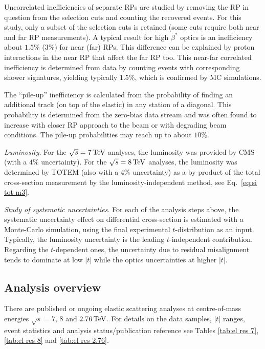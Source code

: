 \documentclass{desyproc}
\def\un#1{\,{\rm #1}}
\begin{document}
Uncorrelated inefficiencies of separate RPs are studied by removing the RP in question from the selection cuts and counting the recovered events. For this study, only a subset of the selection cuts is retained (some cuts require both near and far RP measurements). A typical result for high $\beta^*$ optics is an inefficiency about $1.5\%$ ($3\%$) for near (far) RPs. This difference can be explained by proton interactions in the near RP that affect the far RP too. This near-far correlated inefficiency is determined from data by counting events with corresponding shower signatures, yielding typically $1.5\%$, which is confirmed by MC simulations.

The ``pile-up'' inefficiency is calculated from the probability of finding an additional track (on top of the elastic) in any station of a diagonal. This probability is determined from the zero-bias data stream and was often found to increase with closer RP approach to the beam or with degrading beam conditions. The pile-up probabilities may reach up to about $10\%$.

{\em Luminosity}. For the $\sqrt s = 7\un{TeV}$ analyses, the luminosity was provided by CMS (with a $4\%$ uncertainty). For the $\sqrt s = 8\un{TeV}$ analyses, the luminosity was determined by TOTEM (also with a $4\%$ uncertainty) as a by-product of the total cross-section measurement by the luminosity-independent method, see Eq.~\ref{eq:si tot m3}.

{\em Study of systematic uncertainties}. For each of the analysis steps above, the systematic uncertainty effect
on differential cross-section is estimated with a Monte-Carlo simulation, using the final experimental $t$-distribution as an input. Typically, the luminosity uncertainty is the leading $t$-independent contribution. Regarding the $t$-dependent ones, the uncertainty due to residual misalignment tends to dominate at low $|t|$ while the optics uncertainties at higher $|t|$.


\subsection{Analysis overview}

There are published or ongoing elastic scattering analyses at centre-of-mass energies $\sqrt s = 7$, $8$ and $2.76\un{TeV}$. For details on the data samples, $|t|$ ranges, event statistics and analysis status/publication reference see Tables \ref{tab:el res 7}, \ref{tab:el res 8} and \ref{tab:el res 2.76}.
\end{document}
